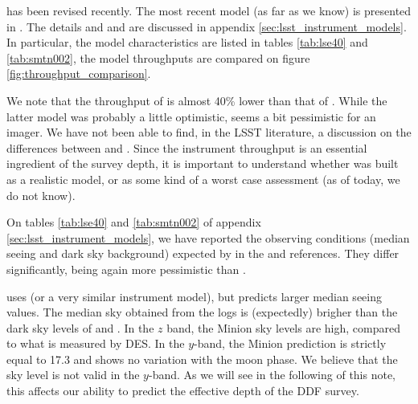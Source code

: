 \documentclass[\docopts]{\docclass}
\begin{document}
 has been revised recently. The most recent model (as far
as we know) is presented in \cite[][hereafter SMTN-002)]{SMTN-002}.
The details and  and  are discussed in
appendix \ref{sec:lsst_instrument_models}.  In particular, the model
characteristics are listed in tables \ref{tab:lse40} and
\ref{tab:smtn002}, the model throughputs are compared on figure
\ref{fig:throughput_comparison}.

We note that the throughput of  is almost 40\% lower
than that of .  While the latter model was probably a
little optimistic,  seems a bit pessimistic for an
imager.  We have not been able to find, in the LSST literature, a
discussion on the differences between  and
.  Since the instrument throughput is an essential
ingredient of the survey depth, it is important to understand whether
 was built as a realistic model, or as some kind of a
worst case assessment (as of today, we do not know).

On tables \ref{tab:lse40} and \ref{tab:smtn002} of appendix
\ref{sec:lsst_instrument_models}, we have reported the observing
conditions (median seeing and dark sky background) expected by in the
 and  references.  They differ
significantly,  being again more pessimistic than
.

 uses  (or a very similar instrument
model), but predicts larger median seeing values.  The median sky
obtained from the  logs is (expectedly) brigher
than the dark sky levels of  and . In the
$z$ band, the Minion sky levels are high, compared to what is measured
by DES.  In the $y$-band, the Minion prediction is strictly equal to
17.3 and shows no variation with the moon phase.  We believe that the
 sky level is not valid in the $y$-band. As we will
see in the following of this note, this affects our ability to predict
the effective depth of the DDF survey.
\end{document}
